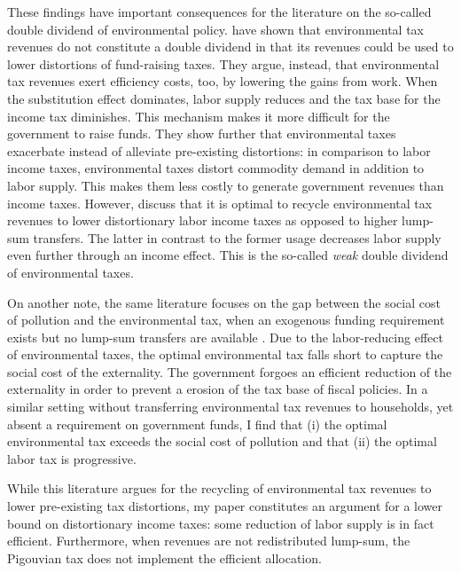 These findings have important consequences for the literature on the so-called double dividend of environmental policy. 
\cite{LansBovenberg1994EnvironmentalTaxation} have shown that environmental tax revenues do not constitute a double dividend in that its revenues could be used to lower distortions of fund-raising taxes. 
They argue, instead, that environmental tax revenues exert efficiency costs, too, by lowering the gains from work. When the substitution effect dominates, labor supply reduces and the tax base for the income tax diminishes. This mechanism makes it more difficult for the government to raise funds. They show further that environmental taxes exacerbate instead of alleviate pre-existing distortions: in comparison to labor income taxes, environmental taxes distort commodity demand in addition to labor supply. This makes them less costly to generate government revenues than income taxes.  However, \cite{LansBovenberg1994EnvironmentalTaxation} discuss that it is optimal to recycle environmental tax revenues to lower distortionary labor income taxes as opposed to higher lump-sum transfers. The latter in contrast to the former usage decreases labor supply even further through an income effect. This is the so-called \textit{weak} double dividend of environmental taxes.  


On another note, the same literature focuses on the gap between the social cost of pollution and the environmental tax, when an exogenous funding requirement exists but no lump-sum transfers are available \cite{LansBovenberg1994EnvironmentalTaxation, LansBovenberg1996OptimalAnalyses, Barrage2019OptimalPolicy}. 
Due to the labor-reducing effect of environmental taxes, the optimal environmental tax   falls short to capture the social cost of the externality. 
The government forgoes an efficient reduction of the externality in order to prevent a erosion of the tax base of fiscal policies. 
In a similar setting without transferring environmental tax revenues to households, yet absent a requirement on government funds, I find that (i) the optimal environmental tax exceeds the social cost of pollution and that (ii) the optimal labor tax is progressive. 

 While this literature argues for the recycling of environmental tax revenues to lower pre-existing tax distortions, my paper constitutes an argument for a lower bound on distortionary income taxes: some reduction of labor supply is in fact efficient. 
Furthermore, when revenues are not redistributed lump-sum, the Pigouvian tax does not implement the efficient allocation. 

